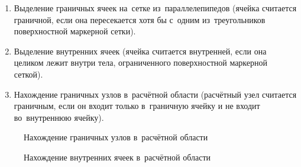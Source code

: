 \documentclass[thesis.tex]{subfiles}
\begin{document}
    \begin{enumerate}
        \item Выделение граничных ячеек на~сетке из~параллелепипедов (ячейка считается граничной, если она пересекается
              хотя бы с~одним из~треугольников поверхностной маркерной сетки).
        \item Выделение внутренних ячеек (ячейка считается внутренней, если она целиком лежит внутри тела, ограниченного
              поверхностной маркерной сеткой).
        \item Нахождение граничных узлов в~расчётной области (расчётный узел считается граничным, если он входит только
              в~граничную ячейку и не входит во~внутреннюю ячейку).
    \end{enumerate}

    \begin{figure}[ht!]
        \centering
            {}
            {}
            {}
        \caption{Нахождение граничных узлов в~расчётной области}
        \label{fig:markers_borders_reconstruction}
    \end{figure}

    \begin{figure}[ht!]
        \centering
            {}
            {}
            {}
        \caption{Нахождение внутренних ячеек в~расчётной области}
        \label{fig:markers_borders_reconstruction_waves}
    \end{figure}
\end{document}
